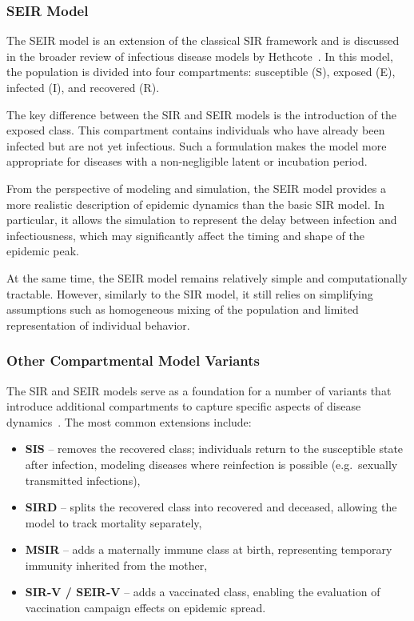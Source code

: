 \documentclass[english]{projectreport}
\begin{document}
\subsubsection{SEIR Model}
\label{sec:seir}

The SEIR model is an extension of the classical SIR framework and is discussed in the broader review of infectious disease models by Hethcote~\cite{hethcote2000mathematics}. In this model, the population is divided into four compartments: susceptible (S), exposed (E), infected (I), and recovered (R).

The key difference between the SIR and SEIR models is the introduction of the exposed class. This compartment contains individuals who have already been infected but are not yet infectious. Such a formulation makes the model more appropriate for diseases with a non-negligible latent or incubation period.

From the perspective of modeling and simulation, the SEIR model provides a more realistic description of epidemic dynamics than the basic SIR model. In particular, it allows the simulation to represent the delay between infection and infectiousness, which may significantly affect the timing and shape of the epidemic peak.

At the same time, the SEIR model remains relatively simple and computationally tractable. However, similarly to the SIR model, it still relies on simplifying assumptions such as homogeneous mixing of the population and limited representation of individual behavior.

\subsubsection{Other Compartmental Model Variants}
\label{sec:variants}

The SIR and SEIR models serve as a foundation for a number of variants
that introduce additional compartments to capture specific aspects of
disease dynamics~\cite{hethcote2000mathematics}. The most common
extensions include:

\begin{itemize}
\item \textbf{SIS} -- removes the recovered class; individuals return to
  the susceptible state after infection, modeling diseases where
  reinfection is possible (e.g.\ sexually transmitted infections),
\item \textbf{SIRD} -- splits the recovered class into recovered and
  deceased, allowing the model to track mortality separately,
\item \textbf{MSIR} -- adds a maternally immune class at birth,
  representing temporary immunity inherited from the mother,
\item \textbf{SIR-V / SEIR-V} -- adds a vaccinated class, enabling the
  evaluation of vaccination campaign effects on epidemic spread.
\end{itemize}
\end{document}
